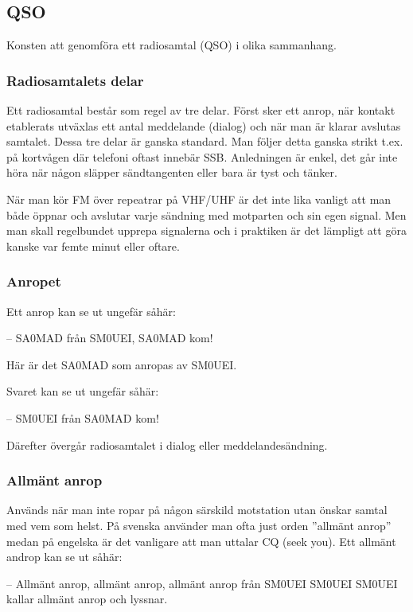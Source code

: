 \subsection{QSO}

Konsten att genomföra ett radiosamtal (QSO) i olika sammanhang.

\subsubsection{Radiosamtalets delar}

Ett radiosamtal består som regel av tre delar. Först sker ett anrop, när kontakt etablerats utväxlas ett antal meddelande (dialog) och när man är klarar avslutas samtalet. Dessa tre delar är ganska standard. Man följer detta ganska strikt t.ex. på kortvågen där telefoni oftast innebär SSB. Anledningen är enkel, det går inte höra när någon släpper sändtangenten eller bara är tyst och tänker.

När man kör FM över repeatrar på VHF/UHF är det inte lika vanligt att man både öppnar och avslutar varje sändning med motparten och sin egen signal. Men man skall regelbundet upprepa signalerna och i praktiken är det lämpligt att göra kanske var femte minut eller oftare.

\subsubsection{Anropet}

Ett anrop kan se ut ungefär såhär:

-- SA0MAD från SM0UEI, SA0MAD kom!

Här är det SA0MAD som anropas av SM0UEI. 

Svaret kan se ut ungefär såhär:

-- SM0UEI från SA0MAD kom!

Därefter övergår radiosamtalet i dialog eller meddelandesändning.

\subsubsection{Allmänt anrop} 

Används när man inte ropar på någon särskild motstation utan önskar samtal med vem som helst. På svenska använder man ofta just orden ''allmänt anrop'' medan på engelska är det vanligare att man uttalar CQ (seek you). Ett allmänt androp kan se ut såhär:

-- Allmänt anrop, allmänt anrop, allmänt anrop från SM0UEI SM0UEI SM0UEI kallar allmänt anrop och lyssnar.


